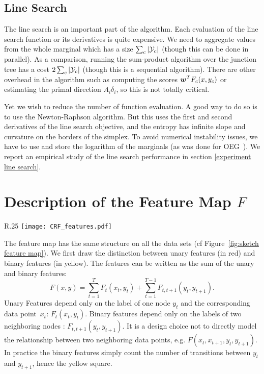 \begin{subappendices}
	\subsection{Line Search} \label{app:sec:implementation line search}
	The line search is an important part of the algorithm.
	Each evaluation of the line search function or its derivatives is quite expensive.
	We need to aggregate values from the whole marginal which has a size $\sum_c | {\mathcal Y}_c |$ (though this can be done in parallel).
	As a comparison, running the sum-product algorithm over the junction tree has a cost $2\sum_c | {\mathcal Y}_c |$ (though this is a sequential algorithm).
	There are other overhead in the algorithm such as computing the scores $\boldsymbol{w}^T F_c(x, y_c)$ or estimating the primal direction $A_i \delta_i$, so this is not totally critical.
	
	Yet we wish to reduce the number of function evaluation.
	A good way to do so is to use the Newton-Raphson algorithm.
	But this uses the first and second derivatives of the line search objective, and the entropy has infinite slope and curvature on the borders of the simplex.
	To avoid numerical instability issues, we have to use and store the logarithm of the marginals (as was done for OEG~\citep{collins2008exponentiated}).
	We report an empirical study of the line search performance in section \ref{experiment line search}.
	
	\section{Description of the Feature Map $F$}
	\label{app:feature}
	\begin{wrapfigure}[20]{R}{.25\textwidth}
		\centering
		\texttt{[image: CRF\_features.pdf]}
		\caption[Sketch of sequence feature maps]{Sketch of the feature map. K is the number of different labels for one node. A is the number of attributes.}
		\label{fig:sketch feature map}
	\end{wrapfigure}
	
	The feature map has the same structure on all the data sets (cf Figure~\ref{fig:sketch feature map}).
	We first draw the distinction between unary features (in red) and binary features (in yellow). The features can be written as the sum of the unary and binary features:
	\begin{equation*}
		F(x, y) = \sum_{t=1}^T F_t(x_t, y_t) +  \sum_{t=1}^{T-1} F_{t, t+1}(y_t, y_{t+1}).
	\end{equation*}
	Unary Features depend only on the label of one node $y_t$ and the corresponding data point~$x_t$: $F_t(x_t, y_t)$.
	Binary features depend only on the labels of two neighboring nodes : $F_{t, t+1}(y_t, y_{t+1})$.
	It is a design choice not to directly model the relationship between two neighboring data points, e.g. $F(x_t, x_{t+1}, y_t, y_{t+1})$.
	In practice the binary features simply count the number of transitions between $y_t$ and $y_{t+1}$, hence the yellow square.
	

\end{subappendices}
